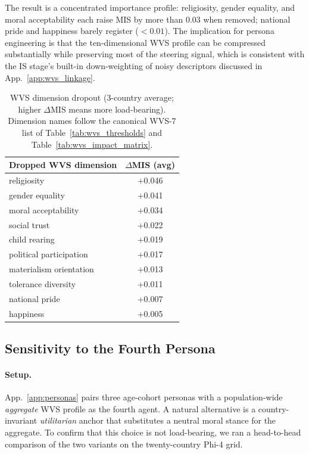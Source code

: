 \documentclass{article}
\begin{document}
The result is a concentrated importance profile: religiosity, gender equality, and moral acceptability each raise MIS by more than $0.03$ when removed; national pride and happiness barely register ($<0.01$). The implication for persona engineering is that the ten-dimensional WVS profile can be compressed substantially while preserving most of the steering signal, which is consistent with the IS stage's built-in down-weighting of noisy descriptors discussed in App.~\ref{app:wvs_linkage}.

\begin{table}[H]
\centering\small
\caption{WVS dimension dropout (3-country average; higher $\Delta$MIS means more load-bearing). Dimension names follow the canonical WVS-7 list of Table~\ref{tab:wvs_thresholds} and Table~\ref{tab:wvs_impact_matrix}.}
\label{tab:wvs_dropout}
\begin{tabular}{lc}
\toprule
Dropped WVS dimension & $\Delta$MIS (avg) \\
\midrule
religiosity & +0.046 \\
gender equality & +0.041 \\
moral acceptability & +0.034 \\
social trust & +0.022 \\
child rearing & +0.019 \\
political participation & +0.017 \\
materialism orientation & +0.013 \\
tolerance diversity & +0.011 \\
national pride & +0.007 \\
happiness & +0.005 \\
\bottomrule
\end{tabular}
\end{table}

\subsection{Sensitivity to the Fourth Persona}
\label{app:r2_persona_variant}

\paragraph{Setup.} App.~\ref{app:personas} pairs three age-cohort personas with a population-wide \emph{aggregate} WVS profile as the fourth agent. A natural alternative is a country-invariant \emph{utilitarian} anchor that substitutes a neutral moral stance for the aggregate. To confirm that this choice is not load-bearing, we ran a head-to-head comparison of the two variants on the twenty-country Phi-4 grid.
\end{document}
